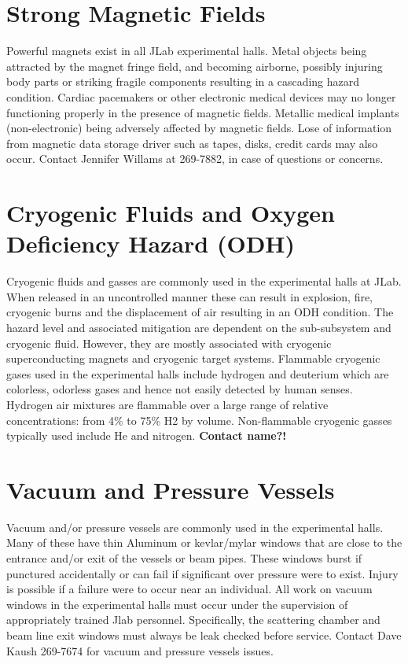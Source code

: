\section{Strong Magnetic Fields}

	Powerful magnets exist in all JLab experimental halls. Metal objects being attracted 
by the magnet fringe field, and becoming airborne, possibly injuring body parts or striking 
fragile components resulting in a cascading hazard condition. Cardiac pacemakers or other 
electronic medical devices may no longer functioning properly in the presence of magnetic fields. 
Metallic medical implants (non-electronic) being adversely affected by magnetic fields. Lose of 
information from magnetic data storage driver such as tapes, disks, credit cards may also occur. 
Contact Jennifer Willams at 269-7882, in case of questions or concerns.

\section{Cryogenic Fluids and Oxygen Deficiency Hazard (ODH)}

	Cryogenic fluids and gasses are commonly used in the experimental halls at JLab. 
When released in an uncontrolled manner these can result in explosion, fire, cryogenic 
burns and the displacement of air resulting in an ODH condition. The hazard level and 
associated mitigation are dependent on the sub-subsystem and cryogenic fluid. However, 
they are mostly associated with cryogenic superconducting magnets and cryogenic target systems. 
Flammable cryogenic gases used in the experimental halls include hydrogen and deuterium which 
are colorless, odorless gases and hence not easily detected by human senses. Hydrogen air 
mixtures are flammable over a large range of relative concentrations: from 4\% to 75\% H2 by volume. 
Non-flammable cryogenic gasses typically used include He and nitrogen. 
{\bf{Contact name?!}}

\section{Vacuum and Pressure Vessels}

	Vacuum and/or pressure vessels are commonly used in the experimental halls. Many 
of these have thin Aluminum or kevlar/mylar windows that are close to the entrance 
and/or exit of the vessels or beam pipes. These windows burst if punctured accidentally 
or can fail if significant over pressure were to exist. Injury is possible if a failure 
were to occur near an individual. All work on vacuum windows in the experimental halls 
must occur under the supervision of appropriately trained Jlab personnel. Specifically, 
the scattering chamber and beam line exit windows must always be leak checked before service. 
Contact Dave Kaush 269-7674 for vacuum and pressure vessels issues.

